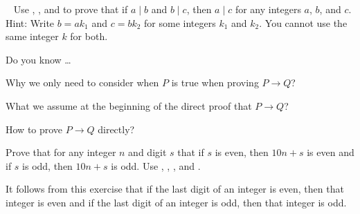 \begin{exer}[\exerU] %
\label{exer_divides_transitive}
~
    Use , , and  to prove that if $a \mid b$ and $b \mid c$, then $a \mid c$ for any integers $a$, $b$, and $c$. Hint: Write $b=ak_1$ and $c=bk_2$ for some integers $k_1$ and $k_2$.  You cannot use the same integer $k$ for both.
\end{exer}

\begin{exer}[\exerR] %
\label{exer_dyk_pffifthen}
    Do you know \ldots
        \begin{exerpart}            
             \item Why we only need to consider when $P$ is true when proving $P \to Q$?
             \item What we assume at the beginning of the direct proof that $P \to Q$?
             \item How to prove $P \to Q$ directly?
        \end{exerpart}
\end{exer}

\begin{exer}[\exerE] %
\label{exer_last_digit_even_odd}
    Prove that for any integer $n$ and digit $s$ that if $s$ is even, then $10n+s$ is even and if $s$ is odd, then $10n+s$ is odd.  Use , , , and .

    It follows from this exercise that if the last digit of an integer is even, then that integer is even and if the last digit of an integer is odd, then that integer is odd.  
\end{exer}


